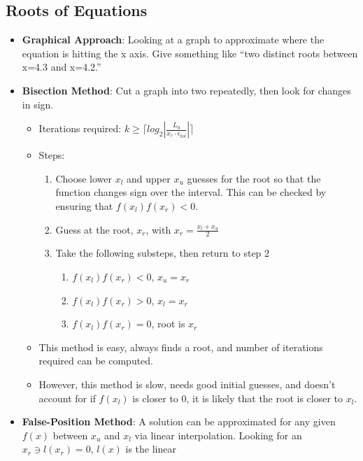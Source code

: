 \documentclass[fontsize=4pt]{scrartcl}
\begin{document}
\begin{multicols}{4}
    \subsection{Roots of Equations}
      \begin{itemize}
       \item \textbf{Graphical Approach}: Looking at a graph to approximate where the equation is hitting the x axis. Give 
          something like ``two distinct roots between x=4.3 and x=4.2.''
       \item \textbf{Bisection Method}: Cut a graph into two repeatedly, then look for changes in sign.
        \begin{itemize}
          \item Iterations required: $k \geq \lceil log_2|\frac{L_0}{x_r \cdot \epsilon_{tol}}|\rceil$
          \item Steps:
          \begin{enumerate}
              \item Choose lower $x_l$ and upper $x_u$ guesses for the root so that the function changes sign over the
              interval. This can be checked by ensuring that $f(x_l)f(x_r) < 0$.
              \item Guess at the root, $x_r$, with $x_r = \frac{x_l + x_u}{2}$
              \item Take the following substeps, then return to step 2
              \begin{enumerate}
                \item $f(x_l)f(x_r) < 0$, $x_u = x_r$
                \item $f(x_l)f(x_r) > 0$, $x_l = x_r$
                \item $f(x_l)f(x_r) = 0$, root is $x_r$
              \end{enumerate}
          \end{enumerate}
          \item This method is easy, always finds a root, and number of iterations required can be computed.
          \item However, this method is slow, needs good initial guesses, and doesn't account for if $f(x_l)$
            is closer to 0, it is likely that the root is closer to $x_l$.
        \end{itemize}
        \item \textbf{False-Position Method}: A solution can be approximated for any given $f(x)$ between $x_u$
          and $x_l$ via linear interpolation. Looking for an $x_r \ni l(x_r) = 0$, $l(x)$ is the linear

\end{itemize}
\end{multicols}
\end{document}
